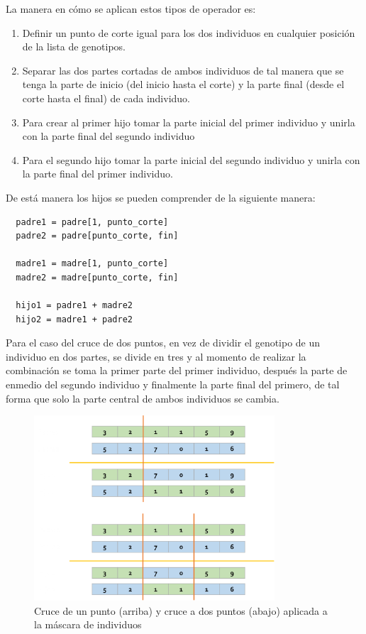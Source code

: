 La manera en cómo se aplican estos tipos de operador es:
\begin{enumerate}
  \item Definir un punto de corte igual para los dos individuos en cualquier
  posición de la lista de genotipos.
  \item Separar las dos partes cortadas de ambos individuos de tal manera que se
  tenga la parte de inicio (del inicio hasta el corte) y la parte final (desde
  el corte hasta el final) de cada individuo.
  \item Para crear al primer hijo tomar la parte inicial del primer individuo y
  unirla con la parte final del segundo individuo
  \item Para el segundo hijo tomar la parte inicial del segundo individuo y
  unirla con la parte final del primer individuo.
\end{enumerate}
De está manera los hijos se pueden comprender de la siguiente manera:
\begin{verbatim}
  padre1 = padre[1, punto_corte]
  padre2 = padre[punto_corte, fin]

  madre1 = madre[1, punto_corte]
  madre2 = madre[punto_corte, fin]

  hijo1 = padre1 + madre2
  hijo2 = madre1 + padre2
\end{verbatim}

Para el caso del cruce de dos puntos, en vez
de dividir el genotipo de un individuo en dos partes, se divide en tres y al
momento de realizar la combinación se toma la primer parte del primer individuo,
después la parte de enmedio del segundo individuo y finalmente la parte final
del primero, de tal forma que solo la parte central de ambos individuos se
cambia.

\begin{figure}
  \centering
  \includegraphics[width=0.8\textwidth]{img/crossover_es.png}
  \caption{Cruce de un punto (arriba) y cruce a dos puntos (abajo) aplicada a la máscara de individuos}
  \label{figure:crossover}
\end{figure}


